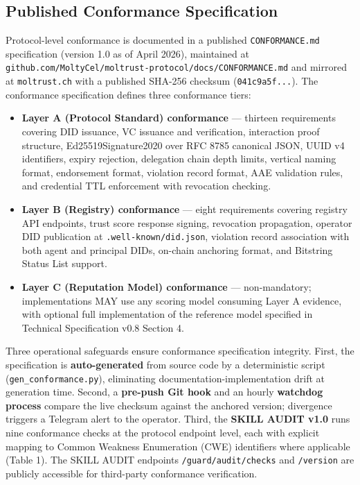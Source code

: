 \subsection{Published Conformance Specification}

Protocol-level conformance is documented in a published \texttt{CONFORMANCE.md} specification (version 1.0 as of April 2026), maintained at \texttt{github.\allowbreak com/\allowbreak MoltyCel/\allowbreak moltrust-protocol/\allowbreak docs/\allowbreak CONFORMANCE.\allowbreak md} and mirrored at \texttt{moltrust.ch} with a published SHA-256 checksum (\texttt{041c9a5f...}). The conformance specification defines three conformance tiers:


\begin{itemize}
\item \textbf{Layer A (Protocol Standard) conformance} — thirteen requirements covering DID issuance, VC issuance and verification, interaction proof structure, Ed25519Signature2020 over RFC 8785 canonical JSON, UUID v4 identifiers, expiry rejection, delegation chain depth limits, vertical naming format, endorsement format, violation record format, AAE validation rules, and credential TTL enforcement with revocation checking.
\item \textbf{Layer B (Registry) conformance} — eight requirements covering registry API endpoints, trust score response signing, revocation propagation, operator DID publication at \texttt{.well-known/did.json}, violation record association with both agent and principal DIDs, on-chain anchoring format, and Bitstring Status List support.
\item \textbf{Layer C (Reputation Model) conformance} — non-mandatory; implementations MAY use any scoring model consuming Layer A evidence, with optional full implementation of the reference model specified in Technical Specification v0.8 Section 4.
\end{itemize}

Three operational safeguards ensure conformance specification integrity. First, the specification is \textbf{auto-generated} from source code by a deterministic script (\texttt{gen\_conformance.py}), eliminating documentation-implementation drift at generation time. Second, a \textbf{pre-push Git hook} and an hourly \textbf{watchdog process} compare the live checksum against the anchored version; divergence triggers a Telegram alert to the operator. Third, the \textbf{SKILL AUDIT v1.0} runs nine conformance checks at the protocol endpoint level, each with explicit mapping to Common Weakness Enumeration (CWE) identifiers where applicable (Table 1). The SKILL AUDIT endpoints \texttt{/guard/audit/checks} and \texttt{/version} are publicly accessible for third-party conformance verification.




